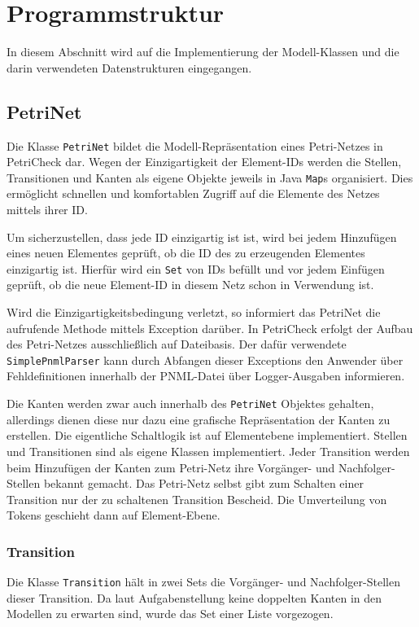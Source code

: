 \section{Programmstruktur}
\label{sec:struct}

In diesem Abschnitt wird auf die Implementierung der Modell-Klassen und die
darin verwendeten Datenstrukturen eingegangen.

\subsection{PetriNet}

Die Klasse \texttt{PetriNet} bildet die Modell-Repräsentation eines Petri-Netzes
in PetriCheck dar. Wegen der Einzigartigkeit der Element-IDs werden die Stellen,
Transitionen und Kanten als eigene Objekte jeweils in Java \texttt{Map}s
organisiert. Dies ermöglicht schnellen und komfortablen Zugriff auf die Elemente
des Netzes mittels ihrer ID.

Um sicherzustellen, dass jede ID einzigartig ist ist, wird bei jedem Hinzufügen
eines neuen Elementes geprüft, ob die ID des zu erzeugenden Elementes
einzigartig ist. Hierfür wird ein \texttt{Set} von IDs befüllt und vor jedem
Einfügen geprüft, ob die neue Element-ID in diesem Netz schon in Verwendung ist.

Wird die Einzigartigkeitsbedingung verletzt, so informiert das PetriNet die
aufrufende Methode mittels Exception darüber. In PetriCheck erfolgt der Aufbau
des Petri-Netzes ausschließlich auf Dateibasis. Der dafür verwendete
\texttt{SimplePnmlParser} kann durch Abfangen dieser Exceptions den Anwender
über Fehldefinitionen innerhalb der PNML-Datei über Logger-Ausgaben informieren.

Die Kanten werden zwar auch innerhalb des \texttt{PetriNet} Objektes gehalten,
allerdings dienen diese nur dazu eine grafische Repräsentation der Kanten zu
erstellen. Die eigentliche Schaltlogik ist auf Elementebene implementiert.
Stellen und Transitionen sind als eigene Klassen implementiert. Jeder Transition
werden beim Hinzufügen der Kanten zum Petri-Netz ihre Vorgänger- und
Nachfolger-Stellen bekannt gemacht. Das Petri-Netz selbst gibt zum Schalten
einer Transition nur der zu schaltenen Transition Bescheid. Die Umverteilung von
Tokens geschieht dann auf Element-Ebene.

\subsubsection{Transition}
Die Klasse \texttt{Transition} hält in zwei Sets die Vorgänger- und
Nachfolger-Stellen dieser Transition. Da laut Aufgabenstellung keine doppelten
Kanten in den Modellen zu erwarten sind, wurde das Set einer Liste vorgezogen.

